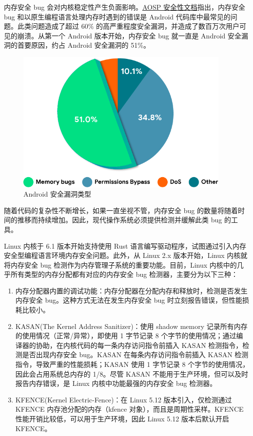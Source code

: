 \documentclass[AutoFakeBold]{LZUThesis}
\begin{document}
\begin{sloppypar}
内存安全 bug
会对内核稳定性产生负面影响。\href{https://source.android.google.cn/docs/security/memory-safety?hl=zh-cn}{AOSP
安全性文档}指出，内存安全 bug 和以原生编程语言处理内存时遇到的错误是
Android 代码库中最常见的问题。此类问题造成了超过 60\%
的高严重程度安全漏洞，并造成了数百万次用户可见的崩溃。从第一个 Android
版本开始，内存安全 bug 就一直是 Android 安全漏洞的首要原因，约占 Android
安全漏洞的 51\%。

\begin{figure}
\centering
\includegraphics[width=300pt]{images/Android-security-report.png}
\caption{Android 安全漏洞类型}
\end{figure}

随着代码的复杂性不断增长，如果一直坐视不管，内存安全 bug
的数量将随着时间的推移而持续增加。因此，现代操作系统必须提供检测并缓解此类
bug 的工具。

Linux 内核于 6.1 版本开始支持使用 Rust
语言编写驱动程序，试图通过引入内存安全型编程语言环境内存安全问题。此外，从
Linux 2.x 版本开始，Linux 内核就将内存安全 bug
检测作为内存管理子系统的重要功能。目前，Linux
内核中的几乎所有类型的内存分配都有对应的内存安全 bug
检测器，主要分为以下三种：

\begin{enumerate}
\def\labelenumi{\arabic{enumi}.}
\item
  内存分配器内置的调试功能：内存分配器在分配内存和释放时，检测是否发生内存安全
  bug。这种方式无法在发生内存安全 bug 时立刻报告错误，但性能损耗比较小。
\item
  KASAN(The Kernel Address Sanitizer)：使用 shadow memory
  记录所有内存的使用情况（正常/异常），即使用 1 字节记录 8
  个字节的使用情况；通过编译器的协助，在内核代码的每一条内存访问指令前插入
  KASAN 检测指令，检测是否出现内存安全 bug。KASAN
  在每条内存访问指令前插入 KASAN 检测指令，导致严重的性能损耗；KASAN
  使用 1 字节记录 8 个字节的使用情况，因此会占用系统总内存的 1/8。尽管
  KASAN 不能用于生产环境，但可以及时报告内存错误，是 Linux
  内核中功能最强的内存安全 bug 检测器。
\item
  KFENCE(Kernel Electric-Fence)：在 Linux 5.12 版本引入，仅检测通过
  KFENCE 内存池分配的内存（kfence 对象），而且是周期性采样。KFENCE
  性能开销比较低，可以用于生产环境，因此 Linux 5.12 版本后默认开启
  KFENCE。
\end{enumerate}


\end{sloppypar}
\end{document}
